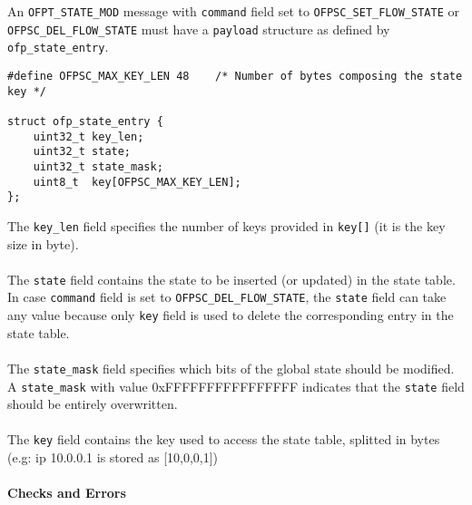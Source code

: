 \noindent
An \texttt{OFPT\_STATE\_MOD} message with \texttt{command} field set to \texttt{OFPSC\_SET\_FLOW\_STATE} or \texttt{OFPSC\_DEL\_FLOW\_STATE} must have a \texttt{payload} structure as defined by \texttt{ofp\_state\_entry}.
\scriptsize
\begin{verbatim}
#define OFPSC_MAX_KEY_LEN 48    /* Number of bytes composing the state key */

struct ofp_state_entry {
    uint32_t key_len;
    uint32_t state;
    uint32_t state_mask;
    uint8_t  key[OFPSC_MAX_KEY_LEN];
};
\end{verbatim}
\normalsize
The \texttt{key\_len} field specifies the number of keys provided in \texttt{key[]} (it is the key size in byte).
\\\\
The \texttt{state} field contains the state to be inserted (or updated) in the state table. In case \texttt{command} field is set to \texttt{OFPSC\_DEL\_FLOW\_STATE}, the \texttt{state} field can take any value because only \texttt{key} field is used to delete the corresponding entry in the state table.
\\\\
The \texttt{state\_mask} field specifies which bits of the global state should be modified. A \texttt{state\_mask} with value 0xFFFFFFFFFFFFFFFF indicates that the \texttt{state} field should be entirely overwritten.
\\\\
The \texttt{key} field contains the key used to access the state table, splitted in bytes (e.g: ip 10.0.0.1 is stored as [10,0,0,1])

\paragraph{Checks and Errors}

